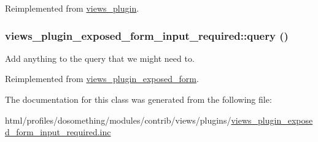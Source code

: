 Reimplemented from \hyperlink{classviews__plugin_a442b0f392deb52725ec8159e05654e06}{views\_\-plugin}.\hypertarget{classviews__plugin__exposed__form__input__required_a452e5c16da60d3b51cdc56335ca3d3e8}{
\subsubsection[{query}]{\setlength{\rightskip}{0pt plus 5cm}views\_\-plugin\_\-exposed\_\-form\_\-input\_\-required::query ()}}
\label{classviews__plugin__exposed__form__input__required_a452e5c16da60d3b51cdc56335ca3d3e8}
Add anything to the query that we might need to. 

Reimplemented from \hyperlink{classviews__plugin__exposed__form_a6e0fedda54c9532c3827b0b97807ac7e}{views\_\-plugin\_\-exposed\_\-form}.

The documentation for this class was generated from the following file:\begin{DoxyCompactItemize}
\item 
html/profiles/dosomething/modules/contrib/views/plugins/\hyperlink{views__plugin__exposed__form__input__required_8inc}{views\_\-plugin\_\-exposed\_\-form\_\-input\_\-required.inc}\end{DoxyCompactItemize}
